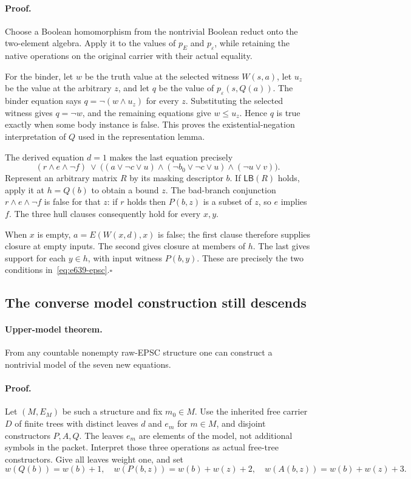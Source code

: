 \paragraph{Proof.}
Choose a Boolean homomorphism from the nontrivial Boolean reduct
onto the two-element algebra.  Apply it to the values of $p_E$
and $p_\varepsilon$, while retaining the native operations on
the original carrier with their actual equality.

For the binder, let $w$ be the truth value at the selected witness
$W(s,a)$, let $u_z$ be the value at the arbitrary $z$, and let $q$
be the value of $p_\varepsilon(s,Q(a))$.  The binder equation says
$q=\neg(w\land u_z)$ for every $z$.  Substituting the selected
witness gives $q=\neg w$, and the remaining equations give
$w\leq u_z$.  Hence $q$ is true exactly when some body instance
is false.  This proves the existential-negation interpretation of
$Q$ used in the representation lemma.

The derived equation $d=1$ makes the last equation precisely
\[
 (r\land e\land\neg f)\ \lor\
 \bigl((a\lor\neg c\lor u)
       \land(\neg b_0\lor\neg c\lor u)
       \land(\neg u\lor v)\bigr).
\]
Represent an arbitrary matrix $R$ by its masking descriptor $b$.
If $\mathsf{LB}(R)$ holds, apply it at $h=Q(b)$ to obtain a bound
$z$.  The bad-branch conjunction $r\land e\land\neg f$ is false
for that $z$: if $r$ holds then $P(b,z)$ is a subset of $z$, so
$e$ implies $f$.  The three hull clauses consequently hold for
every $x,y$.

When $x$ is empty, $a=E(W(x,d),x)$ is false; the first clause
therefore supplies closure at empty inputs.  The second gives
closure at members of $h$.  The last gives support for each
$y\in h$, with input witness $P(b,y)$.  These are precisely the
two conditions in~\eqref{eq:e639-epsc}.\hfill$\square$

\subsection{The converse model construction still descends}

\paragraph{Upper-model theorem.}
From any countable nonempty raw-EPSC structure one can construct
a nontrivial model of the seven new equations.

\paragraph{Proof.}
Let $(M,E_M)$ be such a structure and fix $m_0\in M$.
Use the inherited free carrier $D$ of finite trees with distinct
leaves $d$ and $e_m$ for $m\in M$, and disjoint constructors
$P,A,Q$.  The leaves $e_m$ are elements of the model, not additional
symbols in the packet.  Interpret those three operations as actual
free-tree constructors.  Give all leaves weight one, and set
\begin{equation}
 w(Q(b))=w(b)+1,\quad
 w(P(b,z))=w(b)+w(z)+2,\quad
 w(A(b,z))=w(b)+w(z)+3.
 \label{eq:e639-weights}
\end{equation}


